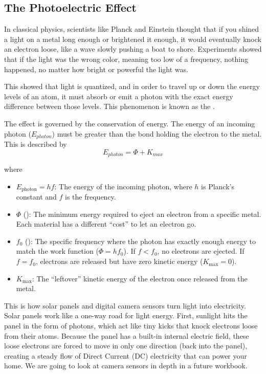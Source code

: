 \subsection{The Photoelectric Effect}

In classical physics, scientists like Planck and Einstein thought that if you shined a light on a metal long enough or brightened it enough, it would eventually knock an electron loose, like a wave slowly pushing a boat to shore. Experiments showed that if the light was the wrong color, meaning too low of a frequency, nothing happened, no matter how bright or powerful the light was. 

This showed that light is quantized, and in order to travel up or down the energy levels of an atom, it must absorb or emit a photon with the exact energy difference between those levels. This phenomenon is known as the .

The effect is governed by the conservation of energy. The energy of an incoming photon ($E_{photon}$) must be greater than the bond holding the electron to the metal. This is described by $$E_{photon} = \Phi + K_{max}$$

where
\begin{itemize}
  \item $E_{\text{photon}} = hf$: The energy of the incoming photon, where $h$ is Planck's constant and $f$ is the frequency. 
  \item $\Phi$ (): The minimum energy required to eject an electron from a specific metal. Each material has a different ``cost'' to let an electron go.
  \item $f_0$ (): The specific frequency where the photon has exactly enough energy to match the work function ($\Phi = hf_0$). If $f < f_0$, no electrons are ejected. If $f = f_0$, electrons are released but have zero kinetic energy ($K_{\max} = 0$).
  \item $K_{\max}$: The ``leftover'' kinetic energy of the electron once released from the metal.
\end{itemize}
This is how solar panels and digital camera sensors turn light into electricity. Solar panels work like a one-way road for light energy. First, sunlight hits the panel in the form of photons, which act like tiny kicks that knock electrons loose from their atoms. Because the panel has a built-in internal electric field, these loose electrons are forced to move in only one direction (back into the panel), creating a steady flow of Direct Current (DC) electricity that can power your home. We are going to look at camera sensors in depth in a future workbook.
